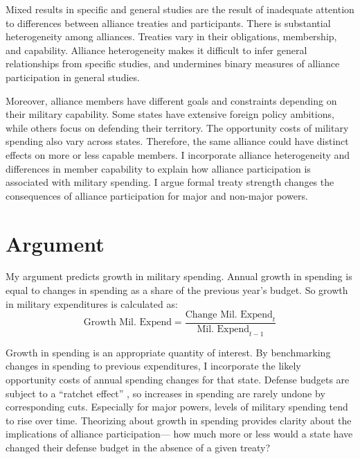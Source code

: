 \documentclass[12pt]{article}
\begin{document}
Mixed results in specific and general studies are the result of inadequate attention to differences between alliance treaties and participants.
There is substantial heterogeneity among alliances.
Treaties vary in their obligations, membership, and capability. 
Alliance heterogeneity makes it difficult to infer general relationships from specific studies, and undermines binary measures of alliance participation in general studies. 
 

Moreover, alliance members have different goals and constraints depending on their military capability.
Some states have extensive foreign policy ambitions, while others focus on defending their territory. 
The opportunity costs of military spending also vary across states. 
Therefore, the same alliance could have distinct effects on more or less capable members. 
I incorporate alliance heterogeneity and differences in member capability to explain how alliance participation is associated with military spending. 
I argue formal treaty strength changes the consequences of alliance participation for major and non-major powers. 



\section{Argument}

My argument predicts growth in military spending. 
Annual growth in spending is equal to changes in spending as a share of the previous year's budget. 
So growth in military expenditures is calculated as:
\begin{equation}
\mbox{Growth Mil. Expend} = \frac{ \mbox{Change Mil. Expend}_t }{ \mbox{Mil. Expend}_{t-1} }
\end{equation} 


Growth in spending is an appropriate quantity of interest. 
By benchmarking changes in spending to previous expenditures, I incorporate the likely opportunity costs of annual spending changes for that state. 
Defense budgets are subject to a ``ratchet effect'' \cite{Zielinskietal2017}, so increases in spending are rarely undone by corresponding cuts.
Especially for major powers, levels of military spending tend to rise over time. 
Theorizing about growth in spending provides clarity about the implications of alliance participation--- how much more or less would a state have changed their defense budget in the absence of a given treaty? 
\end{document}

